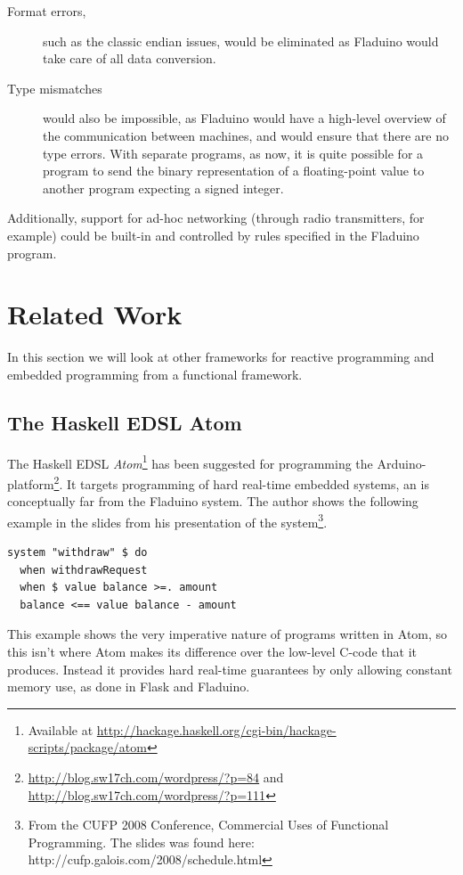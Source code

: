 \documentclass[a4paper, oneside, final]{memoir}
\begin{document}
\begin{description}
\item[Format errors,] such as the classic endian issues, would be
  eliminated as Fladuino would take care of all data conversion.
\item[Type mismatches] would also be impossible, as Fladuino would
  have a high-level overview of the communication between machines,
  and would ensure that there are no type errors.  With separate
  programs, as now, it is quite possible for a program to send the
  binary representation of a floating-point value to another program
  expecting a signed integer.
\end{description}

Additionally, support for ad-hoc networking (through radio
transmitters, for example) could be built-in and controlled by rules
specified in the Fladuino program.

\chapter{Related Work}
In this section we will look at other frameworks for reactive
programming and embedded programming from a functional framework.

\section{The Haskell EDSL Atom}
The Haskell EDSL \textit{Atom}\footnote{Available at
  \url{http://hackage.haskell.org/cgi-bin/hackage-scripts/package/atom}}
has been suggested for programming the
Arduino-platform\footnote{\url{http://blog.sw17ch.com/wordpress/?p=84}
  and \url{http://blog.sw17ch.com/wordpress/?p=111}}.  It targets
programming of hard real-time embedded systems, an is conceptually far
from the Fladuino system. The author shows the following example in
the slides from his presentation of the system\footnote{From the CUFP
  2008 Conference, Commercial Uses of Functional Programming. The
  slides was found here: http://cufp.galois.com/2008/schedule.html}.

\begin{verbatim}
system "withdraw" $ do
  when withdrawRequest
  when $ value balance >=. amount
  balance <== value balance - amount
\end{verbatim}

This example shows the very imperative nature of programs written in
Atom, so this isn't where Atom makes its difference over the low-level
C-code that it produces. Instead it provides hard real-time guarantees
by only allowing constant memory use, as done in Flask and Fladuino.
\end{document}
